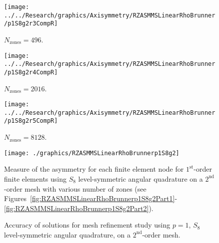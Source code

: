 \documentclass[12pt]{article}
\begin{document}
\begin{sidewaysfigure}[!htb]
\centering
\begin{subfigure}{0.33\textwidth}
\texttt{[image: ../../Research/graphics/Axisymmetry/RZASMMSLinearRhoBrunner/p1S8g2r3CompR]}
\caption{$N_\text{zones}=496$.}
\end{subfigure}%
\begin{subfigure}{0.33\textwidth}
\texttt{[image: ../../Research/graphics/Axisymmetry/RZASMMSLinearRhoBrunner/p1S8g2r4CompR]}
\caption{$N_\text{zones}=2016$.}
\end{subfigure}%
\begin{subfigure}{0.33\textwidth}
\texttt{[image: ../../Research/graphics/Axisymmetry/RZASMMSLinearRhoBrunner/p1S8g2r5CompR]}
\caption{$N_\text{zones}=8128$.}
\end{subfigure}
\caption{Relative asymmetry for $p=1$ finite elements on a $2^\text{nd}$-order mesh for $S_8$ level-symmetric angular quadrature; mesh overlay may be removed for clarity.}
\label{fig:RZASMMSLinearRhoBrunnerp1S8g2Part2}
\end{sidewaysfigure}

\begin{figure}[!htb]
\centering
\texttt{[image: ./graphics/RZASMMSLinearRhoBrunnerp1S8g2]}
\caption{Measure of the asymmetry for each finite element node for $1^\text{st}$-order finite elements using $S_8$ level-symmetric angular quadrature on a $2^\text{nd}$-order mesh with various number of zones (see Figures~\ref{fig:RZASMMSLinearRhoBrunnerp1S8g2Part1}-\ref{fig:RZASMMSLinearRhoBrunnerp1S8g2Part2}).}
\label{fig:RZASMMSLinearRhoBrunnerp1S8g2Nodes}
\end{figure}

\begin{figure}[!htb]
\centering
{}
\caption{Accuracy of solutions for mesh refinement study using $p=1$, $S_8$ level-symmetric angular quadrature, on a $2^\text{nd}$-order mesh.}
\label{fig:RZASMMSLinearRhoBrunnerp1S8g2Accuracy}
\end{figure}
\end{document}
